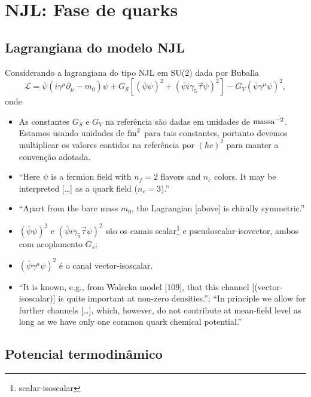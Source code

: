 \chapter{NJL: Fase de quarks}

\section{Lagrangiana do modelo NJL}

Considerando a lagrangiana do tipo NJL em SU(2) dada por Buballa\cite{Buballa1996}
\begin{equation}
	\mathcal{L} = \bar{\psi}(i\gamma^\mu\partial_\mu - m_0)\psi + G_S[(\bar{\psi}\psi)^2 + (\bar{\psi}i\gamma_5\vec{\tau}\psi)^2] - G_V(\bar{\psi}\gamma^\mu \psi)^2,
\end{equation}
%
onde
\begin{itemize}
	\item As constantes $G_S$ e $G_V$ na referência são dadas em unidades de $\rm{massa}^{-2}$. Estamos usando unidades de $\rm{fm}^2$ para tais constantes, portanto devemos multiplicar os valores contidos na referência por $(\hbar c)^2$ para manter a convenção adotada.
	\item ``Here $\psi$ is a fermion field with $n_f = 2$ flavors and $n_c$ colors. It may be interpreted [\dots] as a quark field ($n_c = 3$).''
	\item ``Apart from the bare mass $m_0$, the Lagrangian [above] is chirally symmetric.''
	\item $(\bar{\psi}\psi)^2$ e $(\bar{\psi}i\gamma_5\vec{\tau}\psi)^2$ são os canais scalar\footnote{scalar-isoscalar} e pseudoscalar-isovector, ambos com acoplamento $G_s$;
	\item $(\bar{\psi}\gamma^\mu \psi)^2$ é o canal vector-isoscalar. 
	\item ``It is known, e.g., from Walecka model [109], that this channel [(vector-isoscalar)] is quite important at non-zero densities.''; ``In principle we allow for further channels [\dots], which, however, do not contribute at mean-field level as long as we have only one common quark chemical potential.''\cite{Buballa}
\end{itemize}

\section{Potencial termodinâmico}

